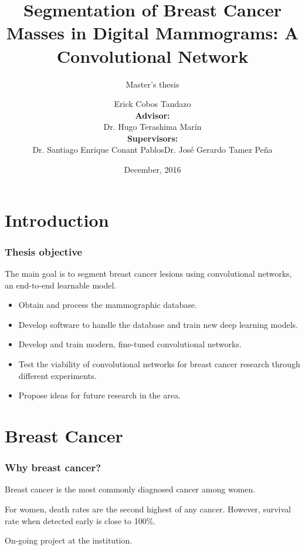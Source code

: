 \documentclass{beamer}
\title[Thesis Dissertation]{Segmentation of Breast Cancer Masses in Digital Mammograms: A Convolutional Network}
\subtitle{Master's thesis}
\author[Erick Cobos]{Erick Cobos Tandazo \\ \medskip \footnotesize \textbf{Advisor:}\\Dr. Hugo Terashima Marín \\ \textbf{Supervisors:}\\Dr. Santiago Enrique Conant Pablos\hfill Dr. José Gerardo Tamez Peña}
\date[December, 2016]{December, 2016}
\institute[Tec de Monterrey]{
    Centro de Sistemas Intelligentes \\ Tecnologico de Monterrey}
\begin{document}
	\begin{frame}
		\titlepage
	\end{frame}
		
    \section[Introduction]{Introduction}
    \begin{frame}
		\frametitle{Thesis objective}
			The main goal is to segment breast cancer lesions using convolutional networks, an end-to-end learnable model.
		
		\begin{itemize}
			\item Obtain and process the mammographic database. %
			\item Develop software to handle the database and train new deep learning models.
			\item Develop and train modern, fine-tuned convolutional networks.%
			\item Test the viability of convolutional networks for breast cancer research through different experiments.
			\item Propose ideas for future research in the area.
		\end{itemize}
	\end{frame}
   
    \section[Breast Cancer]{Breast Cancer}
    \begin{frame}
     	\frametitle{Why breast cancer?}
     		Breast cancer is the most commonly diagnosed cancer among women.
     		
     		For women, death rates are the second highest of any cancer. However, survival rate when detected early is close to 100\%.
     		
     		On-going project at the institution.
    \end{frame}
\end{document}

